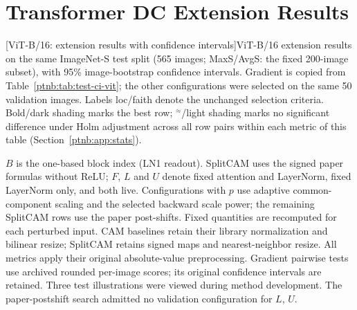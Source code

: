 \section{Transformer DC Extension Results}
\label{sec:vit-extension}
\begin{center}
    \captionsetup{hypcap=false}
    [ViT-B/16: extension results with confidence intervals]{ViT-B/16 extension results on the same ImageNet-S test split (565 images; MaxS/AvgS: the fixed 200-image subset), with 95\% image-bootstrap confidence intervals. Gradient is copied from Table~\ref{ptnb:tab:test-ci-vit}; the other configurations were selected on the same 50 validation images. Labels loc/faith denote the unchanged selection criteria. Bold/dark shading marks the best row; $^{\approx}$/light shading marks no significant difference under Holm adjustment across all row pairs within each metric of this table (Section~\ref{ptnb:app:stats}).}
    \label{tab:vit-extension}
\end{center}
\captionsetup{hypcap=true}
\noindent $B$ is the one-based block index (LN1 readout). SplitCAM uses the signed paper formulas without ReLU; $F$, $L$ and $U$ denote fixed attention and LayerNorm, fixed LayerNorm only, and both live. Configurations with $p$ use adaptive common-component scaling and the selected backward scale power; the remaining SplitCAM rows use the paper post-shifts. Fixed quantities are recomputed for each perturbed input. CAM baselines retain their library normalization and bilinear resize; SplitCAM retains signed maps and nearest-neighbor resize. All metrics apply their original absolute-value preprocessing. Gradient pairwise tests use archived rounded per-image scores; its original confidence intervals are retained. Three test illustrations were viewed during method development.
The paper-postshift search admitted no validation configuration for $L$, $U$.
